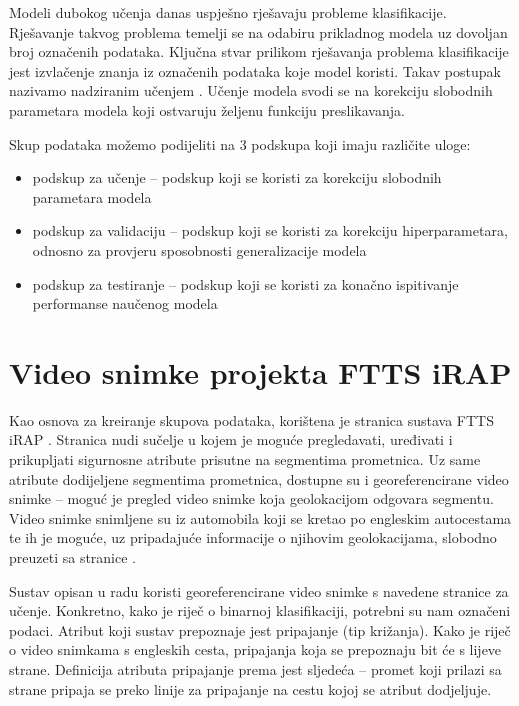 \documentclass[times, utf8, diplomski, numeric]{fer}
\begin{document}
Modeli dubokog učenja danas uspješno rješavaju probleme klasifikacije. Rješavanje takvog problema temelji se na odabiru prikladnog modela uz dovoljan broj označenih podataka. 
Ključna stvar prilikom rješavanja problema klasifikacije jest izvlačenje znanja iz označenih podataka koje model koristi. Takav postupak nazivamo nadziranim učenjem \citep{book:deeplearningbook}. 
Učenje modela svodi se na korekciju slobodnih parametara modela koji ostvaruju željenu funkciju preslikavanja.

Skup podataka možemo podijeliti na 3 podskupa koji imaju različite uloge:
\begin{itemize}
 \item podskup za učenje -- podskup koji se koristi za korekciju slobodnih parametara modela
 \item podskup za validaciju -- podskup koji se koristi za korekciju hiperparametara, odnosno za provjeru sposobnosti generalizacije modela
 \item podskup za testiranje -- podskup koji se koristi za konačno ispitivanje performanse naučenog modela
\end{itemize}


\section{Video snimke projekta FTTS iRAP}

Kao osnova za kreiranje skupova podataka, korištena je stranica sustava FTTS iRAP \citep{url:ftts_irap}. 
Stranica nudi sučelje u kojem je moguće pregledavati, uređivati i prikupljati sigurnosne atribute prisutne na segmentima prometnica.
Uz same atribute dodijeljene segmentima prometnica, dostupne su i georeferencirane video snimke -- moguć je pregled video snimke koja geolokacijom odgovara segmentu.
Video snimke snimljene su iz automobila koji se kretao po engleskim autocestama te ih je moguće, uz pripadajuće informacije o njihovim geolokacijama, slobodno preuzeti sa stranice \citep{url:ftts_irap}.

Sustav opisan u radu koristi georeferencirane video snimke s navedene stranice za učenje. Konkretno, kako je riječ o binarnoj klasifikaciji, potrebni su nam označeni podaci. 
Atribut koji sustav prepoznaje jest pripajanje  (tip križanja). Kako je riječ o video snimkama s engleskih cesta, pripajanja koja se prepoznaju bit će s lijeve strane.
Definicija atributa pripajanje prema \citep{man:ftts_irap_coding_manual} jest sljedeća -- promet koji prilazi sa strane pripaja se preko linije za pripajanje na cestu kojoj se atribut dodjeljuje.
\end{document}
